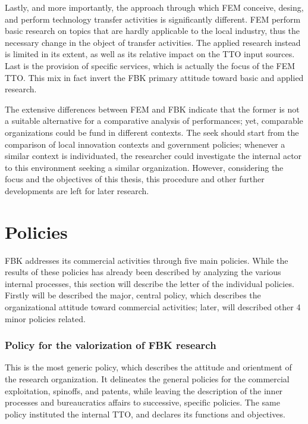 Lastly, and more importantly, the approach through which FEM conceive, desing, and perform technology transfer activities is significantly different. FEM perform basic research on topics that are hardly applicable to the local industry, thus the necessary change in the object of transfer activities. The applied research instead is limited in its extent, as well as its relative impact on the TTO input sources. Last is the provision of specific services, which is actually the focus of the FEM TTO. This mix in fact invert the FBK primary attitude toward basic and applied research.

The extensive differences between FEM and FBK indicate that the former is not a suitable alternative for a comparative analysis of performances; yet, comparable organizations could be fund in different contexts. The seek should start from the comparison of local innovation contexts and government policies; whenever a similar context is individuated, the researcher could investigate the internal actor to this environment seeking a similar organization. However, considering the focus and the objectives of this thesis, this procedure and other further developments are left for later research.

\section{Policies}

FBK addresses its commercial activities through five main policies. While the results of these policies has already been described by analyzing the various internal processes, this section will describe the letter of the individual policies. Firstly will be described the major, central policy, which describes the organizational attitude toward commercial activities; later, will described other 4 minor policies related.

\subsubsection{Policy for the valorization of FBK research}

This is the most generic policy, which describes the attitude and orientment of the research organization. It delineates the general policies for the commercial exploitation, spinoffs, and patents, while leaving the description of the inner processes and bureaucratics affairs to successive, specific policies. The same policy instituted the internal TTO, and declares its functions and objectives.

